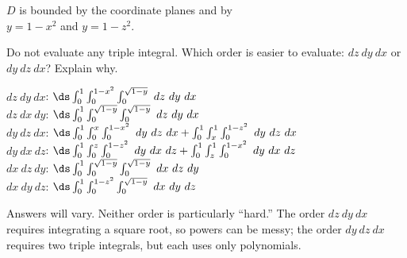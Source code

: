 {$D$ is bounded by the coordinate planes and by \\
$y=1-x^2$ and $y=1-z^2$.

Do not evaluate  any triple integral. Which order is easier to evaluate: $dz\ dy\ dx$ or $dy\ dz\ dx$? Explain why.

}
{$dz\ dy\ dx$: $\ds\int_{0}^1\int_{0}^{1-x^2}\int_{0}^{\sqrt{1-y}}\ dz\ dy\ dx$\\
	$dz\ dx\ dy$: $\ds\int_{0}^1\int_{0}^{\sqrt{1-y}}\int_{0}^{\sqrt{1-y}}\ dz\ dy\ dx$\\
	$dy\ dz\ dx$: $\ds\int_{0}^1\int_0^{x}\int_{0}^{1-x^2}\ dy\ dz\ dx + \int_{0}^1\int_x^{1}\int_{0}^{1-z^2}\ dy\ dz\ dx$\\
	$dy\ dx\ dz$: $\ds\int_0^1\int_{0}^{z}\int_{0}^{1-z^2}\ dy\ dx\ dz+\int_0^1\int_{z}^{1}\int_{0}^{1-x^2}\ dy\ dx\ dz$\\
	$dx\ dz\ dy$: $\ds\int_{0}^1\int_{0}^{\sqrt{1-y}}\int_{0}^{\sqrt{1-y}}\ dx\ dz\ dy$\\
	$dx\ dy\ dz$: $\ds\int_0^1\int_{0}^{1-z^2}\int_{0}^{\sqrt{1-y}}\ dx\ dy\ dz$
	
	Answers will vary. Neither order is particularly ``hard.'' The order $dz\ dy\ dx$ requires integrating a square root, so powers can be messy; the order $dy\ dz\ dx$ requires two triple integrals, but each uses only polynomials. 
}
